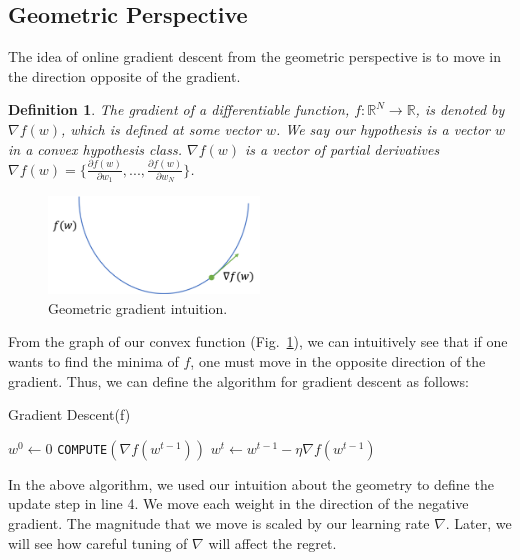 \documentclass[11pt]{article}
\newtheorem{definition}[theorem]{Definition}
\begin{document}
\subsection{Geometric Perspective}
The idea of online gradient descent from the geometric perspective is to move in the direction opposite of the gradient.
\begin{definition}
The gradient of a differentiable function, $f: \mathbb{R}^N \to \mathbb{R}$, is denoted by $\nabla f(w)$, which is defined at some vector $w$. We say our hypothesis is a vector $w$ in a convex hypothesis class. $\nabla f(w)$ is a vector of partial derivatives $\nabla f(w) = \{\frac{\partial f(w)}{\partial w_1},...,\frac{\partial f(w)}{\partial w_N}\}$. 
\end{definition}
\begin{figure}[!h]
    \centering
    \includegraphics[width=0.5\textwidth]{geometric_gradient.png}
    \caption{Geometric gradient intuition.}
    \label{fig:geometric}
\end{figure}
From the graph of our convex function (Fig.~\ref{fig:geometric}), we can intuitively see that if one wants to find the minima of $f$, one must move in the opposite direction of the gradient. 
Thus, we can define the algorithm for gradient descent as follows:
\begin{algorithm}[!h]
\caption{Gradient Descent(f)}
\begin{algorithmic}[1]
\STATE $w^0 \gets 0$
    \STATE \texttt{COMPUTE}$(\nabla f(w^{t-1}))$
    \STATE $w^t \gets w^{t-1} - \eta \nabla f(w^{t-1})$ 
\ENDFOR
\end{algorithmic}
\end{algorithm}
In the above algorithm, we used our intuition about the geometry to define the update step in line 4. We move each weight in the direction of the negative gradient. The magnitude that we move is scaled by our learning rate $\nabla$. Later, we will see how careful tuning of $\nabla$ will affect the regret.
\end{document}
